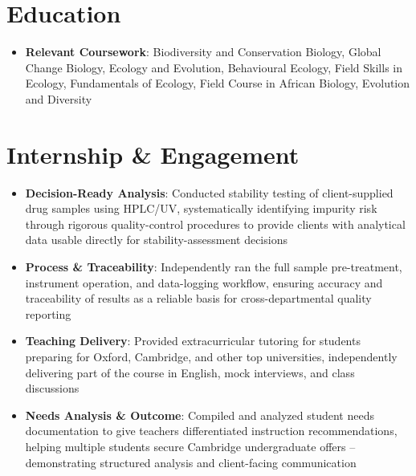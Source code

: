 \documentclass{my-resume}
\begin{document}


\section{Education}
\begin{itemize}[parsep=0.2ex]
  \item \textbf{Relevant Coursework}: Biodiversity and Conservation Biology, Global Change Biology, Ecology and Evolution, Behavioural Ecology, Field Skills in Ecology, Fundamentals of Ecology, Field Course in African Biology, Evolution and Diversity
\end{itemize}

\section{Internship \& Engagement}
\begin{itemize}[parsep=0.2ex]
  \item \textbf{Decision-Ready Analysis}: Conducted stability testing of client-supplied drug samples using HPLC/UV, systematically identifying impurity risk through rigorous quality-control procedures to provide clients with analytical data usable directly for stability-assessment decisions
  \item \textbf{Process \& Traceability}: Independently ran the full sample pre-treatment, instrument operation, and data-logging workflow, ensuring accuracy and traceability of results as a reliable basis for cross-departmental quality reporting
\end{itemize}
\begin{itemize}[parsep=0.2ex]
  \item \textbf{Teaching Delivery}: Provided extracurricular tutoring for students preparing for Oxford, Cambridge, and other top universities, independently delivering part of the course in English, mock interviews, and class discussions
  \item \textbf{Needs Analysis \& Outcome}: Compiled and analyzed student needs documentation to give teachers differentiated instruction recommendations, helping multiple students secure Cambridge undergraduate offers -- demonstrating structured analysis and client-facing communication
\end{itemize}
\end{document}
